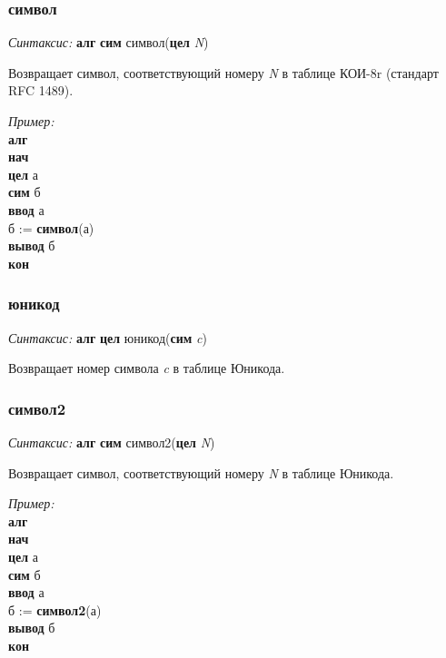 \normalfont
\subsubsection{символ}

\emph{Синтаксис:} \textbf{алг} \textbf{сим} символ(\textbf{цел} \emph{N})


    

      Возвращает символ, соответствующий номеру \emph{N} в таблице КОИ-8r (стандарт RFC 1489).

\emph{Пример:}      
\sffamily
~\\\textbf{алг 
~\\нач
~\\\otstup цел} а
~\\\otstup \textbf{сим} б
~\\\otstup \textbf{ввод} а
~\\\otstup б := \textbf{символ}(а)
~\\\otstup \textbf{вывод} б
~\\\textbf{кон  }




\normalfont
\subsubsection{юникод}

\emph{Синтаксис:} \textbf{алг} \textbf{цел} юникод(\textbf{сим} \emph{c})


    
      Возвращает номер символа \emph{c} в таблице Юникода.
      
  
\normalfont

\normalfont
\subsubsection{символ2}

\emph{Синтаксис:} \textbf{алг} \textbf{сим} символ2(\textbf{цел} \emph{N})


   
 
      Возвращает символ, соответствующий номеру \emph{N} в таблице Юникода.
      
\emph{Пример:}  
\sffamily
~\\\textbf{алг 
~\\нач
~\\\otstup цел} а
~\\\otstup \textbf{сим} б
~\\\otstup \textbf{ввод} а
~\\\otstup б := \textbf{символ2}(а)
~\\\otstup \textbf{вывод} б
~\\\textbf{кон}

